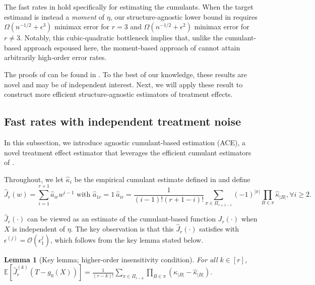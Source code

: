 \documentclass{article}
\def\eps{{\epsilon}}
\def\gO{{\mathcal{O}}}
\newcommand{\E}{\mathbb{E}}
\newcommand{\textfrac}[2]{{\textstyle\frac{#1}{#2}}}
\newtheorem{lemma}{Lemma}[section]
\begin{document}
The fast rates in  hold specifically for estimating the cumulants. When the target estimand is instead a \emph{moment} of $\eta$, our structure-agnostic lower bound in  requires  $\Omega(n^{-1/2}+\eps^3)$ minimax error for $r=3$ and $\Omega(n^{-1/2}+\eps^2)$ minimax error for $r\neq 3$. 
Notably, this cubic-quadratic bottleneck implies that, unlike the cumulant-based approach espoused here, the moment-based approach of \citet{mackey2018orthogonal} cannot attain arbitrarily high‐order error rates. 

%


The proofs of  can be found in . To the best of our knowledge, these results are novel and may be of independent interest. Next, we will apply these result to construct more efficient structure-agnostic estimators of treatment effects. %

\subsection{Fast rates with independent treatment noise}
\label{sec:fast-rates}
In this subsection, we introduce agnostic cumulant-based estimation (ACE), a novel treatment effect estimator that  leverages the efficient cumulant estimators of . %


Throughout, we let $\hat{\kappa}_i$ be the empirical cumulant estimate  defined in  
and define
\begin{equation}
    \label{eq:hat-J-l}
    \hat{J}_r(w) = \sum_{i=1}^{r+1} \hat{a}_{ir} w^{i-1}  \text{ with } \hat{a}_{1r} = 1 \  \hat{a}_{ir} = \textfrac{1}{(i-1)!(r+1-i)!} \sum_{\pi\in\Pi_{r+1-i}} (-1)^{|\pi|} \prod_{B\in\pi}\hat{\kappa}_{|B|}, \forall i\geq 2.
\end{equation}

$\hat{J}_r(\cdot)$ can be viewed as an estimate of the cumulant-based function $J_r(\cdot)$  when $X$ is independent of $\eta$. The key observation is that this $\hat{J}_r(\cdot)$ satisfies  with $\eps^{(j)}=\gO(\eps_1^j)$, which follows from the key lemma stated below.

\begin{lemma}[Key lemma; higher-order insensitivity condition]
    \label{lemma:derivative-expression}
    For all $k\in[r]$, $\E\left[\hat{J}_r^{(k)}(T-g_0(X))\right] = \frac{1}{(r-k)!} \sum_{\pi\in\Pi_{r-k}} \prod_{B\in\pi} \left(\kappa_{|B|}-\hat{\kappa}_{|B|}\right).$
\end{lemma}
\end{document}
